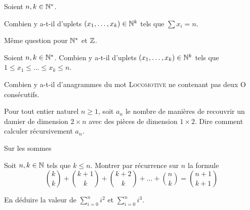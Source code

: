 \documentclass[french]{report}
\begin{document}
\begin{exo}
    Soient \(n,k\in\mathbb{N}^*\).
    \begin{q}{1}
        Combien y a-t-il d'uplets \(\left(x_1,\dots,x_k\right)\in\mathbb{N}^k\) tels que \(\sum x_i = n\).
    \end{q}
    \begin{q}{2}
        Même question pour \(\mathbb{N}^*\) et \(\mathbb{Z}\).
    \end{q}
\end{exo}

\begin{exo}
    Soient \(n,k\in\mathbb{N}^*\). Combien y a-t-il d'uplets \(\left(x_1,\dots,x_k\right)\in\mathbb{N}^k\)
    tels que \(1\leq x_1\leq\dots\leq x_k\leq n\).
\end{exo}

\begin{exo}
    Combien y a-t-il d'anagrammes du mot \textsc{Locomotive} ne contenant pas
    deux \textsc{O} consécutifs.
\end{exo}

\begin{exo}
    Pour tout entier naturel \(n\geq 1\), soit \(a_n\) le nombre de manières de recouvrir
    un damier de dimension \(2\times n\) avec des pièces de dimension \(1\times 2\).
    Dire comment calculer récursivement \(a_n\).
\end{exo}

\begin{exo} Sur les sommes
    \begin{q}{1}
        Soit \(n,k\in\mathbb{N}\) tels que \(k\leq n\). Montrer par récurrence sur \(n\) la formule
        \[\binom{k}{k}+\binom{k+1}{k}+\binom{k+2}{k}+\dots+\binom{n}{k}=\binom{n+1}{k+1}\]
    \end{q}
    \begin{q}{2}
        En déduire la valeur de \(\sum_{i=0}^n i^2\) et \(\sum_{i=0}^n i^3\).
    \end{q}
\end{exo}
\end{document}
